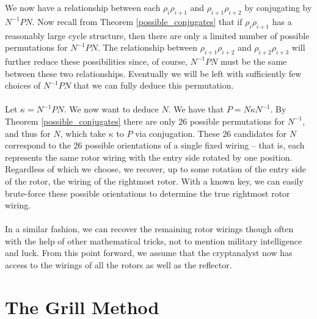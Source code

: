 We now have a relationship between each $\rho_i\rho_{i+1}$ and
$\rho_{i+1}\rho_{i+2}$ by conjugating by $N^{-1}PN$. Now recall from
Theorem \ref{possible_conjugates} that if $\rho_i\rho_{i+1}$ has a reasonably large
cycle structure, then there are only a limited number of possible
permutations for $N^{-1}PN$. The relationship between
$\rho_{i+1}\rho_{i+2}$ and $\rho_{i+2}\rho_{i+3}$ will further
reduce these possibilities since, of course, $N^{-1}PN$ must be the
same between these two relationships. Eventually we will be left with sufficiently few choices of $N^{-1}PN$ that we can fully deduce this permutation. 
\\\\Let $\kappa = N^{-1}PN$. We now want to deduce $N$. We have that $P = N\kappa N^{-1}$. By Theorem \ref{possible_conjugates} there are only $26$ possible permutations for $N^{-1}$, and thus for $N$, which take $\kappa$ to $P$ via conjugation. These $26$ candidates for $N$ correspond to the $26$ possible orientations of a single fixed wiring -- that is, each represents the same rotor wiring with the entry side rotated by one position. Regardless of which we choose, we recover, up to some rotation of the entry side of the rotor, the wiring of the rightmost rotor. With a known key, we can easily brute-force these possible orientations to determine the true rightmost rotor wiring.  
\\\\In a similar fashion, we can recover the remaining rotor wirings
though often with the help of other mathematical tricks, not to
mention military intelligence and luck. From this point forward, we assume that the cryptanalyst now has access to the wirings of
all the rotors as well as the reflector.

\section{The Grill Method}


